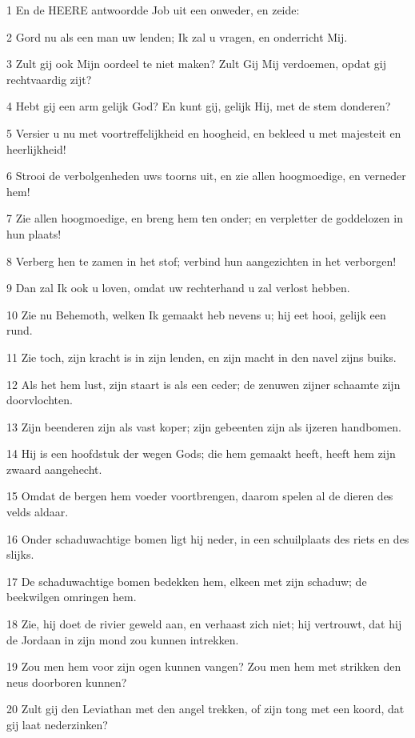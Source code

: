 \par 1 En de HEERE antwoordde Job uit een onweder, en zeide:
\par 2 Gord nu als een man uw lenden; Ik zal u vragen, en onderricht Mij.
\par 3 Zult gij ook Mijn oordeel te niet maken? Zult Gij Mij verdoemen, opdat gij rechtvaardig zijt?
\par 4 Hebt gij een arm gelijk God? En kunt gij, gelijk Hij, met de stem donderen?
\par 5 Versier u nu met voortreffelijkheid en hoogheid, en bekleed u met majesteit en heerlijkheid!
\par 6 Strooi de verbolgenheden uws toorns uit, en zie allen hoogmoedige, en verneder hem!
\par 7 Zie allen hoogmoedige, en breng hem ten onder; en verpletter de goddelozen in hun plaats!
\par 8 Verberg hen te zamen in het stof; verbind hun aangezichten in het verborgen!
\par 9 Dan zal Ik ook u loven, omdat uw rechterhand u zal verlost hebben.
\par 10 Zie nu Behemoth, welken Ik gemaakt heb nevens u; hij eet hooi, gelijk een rund.
\par 11 Zie toch, zijn kracht is in zijn lenden, en zijn macht in den navel zijns buiks.
\par 12 Als het hem lust, zijn staart is als een ceder; de zenuwen zijner schaamte zijn doorvlochten.
\par 13 Zijn beenderen zijn als vast koper; zijn gebeenten zijn als ijzeren handbomen.
\par 14 Hij is een hoofdstuk der wegen Gods; die hem gemaakt heeft, heeft hem zijn zwaard aangehecht.
\par 15 Omdat de bergen hem voeder voortbrengen, daarom spelen al de dieren des velds aldaar.
\par 16 Onder schaduwachtige bomen ligt hij neder, in een schuilplaats des riets en des slijks.
\par 17 De schaduwachtige bomen bedekken hem, elkeen met zijn schaduw; de beekwilgen omringen hem.
\par 18 Zie, hij doet de rivier geweld aan, en verhaast zich niet; hij vertrouwt, dat hij de Jordaan in zijn mond zou kunnen intrekken.
\par 19 Zou men hem voor zijn ogen kunnen vangen? Zou men hem met strikken den neus doorboren kunnen?
\par 20 Zult gij den Leviathan met den angel trekken, of zijn tong met een koord, dat gij laat nederzinken?
